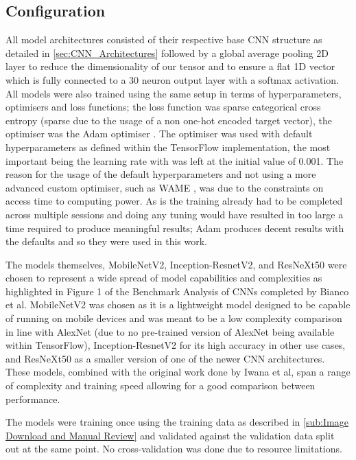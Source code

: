 \documentclass[12pt]{article}
\numberwithin{equation}{section}
\numberwithin{figure}{section}
\begin{document}
\subsection{Configuration} 
\label{sub:Configuration} 
All model architectures consisted of their respective base CNN structure as detailed in \cref{sec:CNN_Architectures} followed by a global average pooling 2D layer to reduce the dimensionality of our tensor and to ensure a flat 1D vector which is fully connected to a 30 neuron output layer with a softmax activation. All models were also trained using the same setup in terms of hyperparameters, optimisers and loss functions; the loss function was sparse categorical cross entropy (sparse due to the usage of a non one-hot encoded target vector), the optimiser was the Adam optimiser \cite{Kingma2015}. The optimiser was used with default hyperparameters as defined within the TensorFlow implementation, the most important being the learning rate with was left at the initial value of 0.001. The reason for the usage of the default hyperparameters and not using a more advanced custom optimiser, such as WAME \cite{Mosca2017}, was due to the constraints on access time to computing power. As is the training already had to be completed across multiple sessions and doing any tuning would have resulted in too large a time required to produce meaningful results; Adam produces decent results with the defaults and so they were used in this work.

The models themselves, MobileNetV2, Inception-ResnetV2, and ResNeXt50 were chosen to represent a wide spread of model capabilities and complexities as highlighted in Figure 1 of the Benchmark Analysis of CNNs completed by Bianco et al\cite{Bianco2018}. MobileNetV2 was chosen as it is a lightweight model designed to be capable of running on mobile devices and was meant to be a low complexity comparison in line with AlexNet (due to no pre-trained version of AlexNet being available within TensorFlow), Inception-ResnetV2 for its high accuracy in other use cases, and ResNeXt50 as a smaller version of one of the newer CNN architectures. These models, combined with the original work done by Iwana et al, span a range of complexity and training speed allowing for a good comparison between performance.

The models were training once using the training data as described in \cref{sub:Image Download and Manual Review} and validated against the validation data split out at the same point. No cross-validation was done due to resource limitations.
\end{document}
